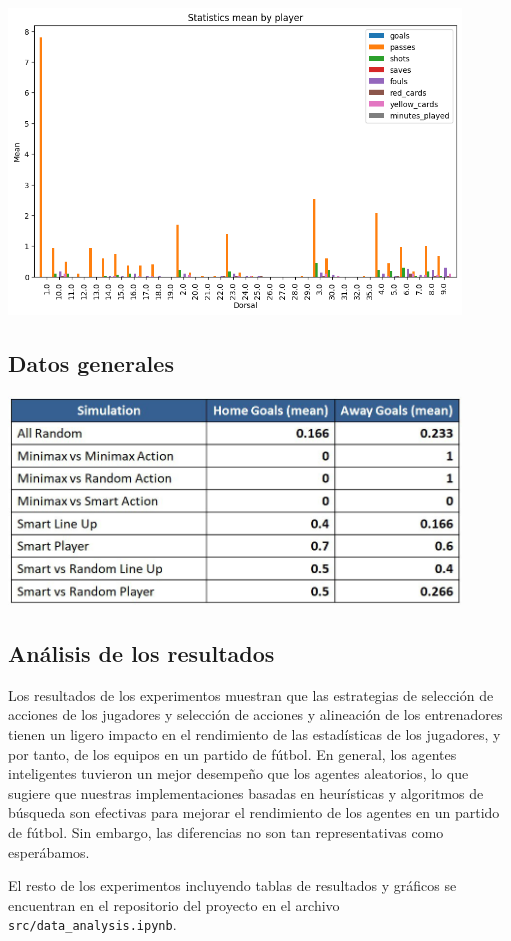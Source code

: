 \documentclass{article}
\begin{document}
\includegraphics[width=0.9\textwidth,height=0.5\textwidth]{smart_vs_random_line_up_away.png}

\subsection{Datos generales}

\includegraphics[width=0.9\textwidth]{general_data.jpg}

\subsection{Análisis de los resultados}
Los resultados de los experimentos muestran que las estrategias de selección de acciones de los jugadores y selección de acciones y alineación de los entrenadores
tienen un ligero impacto en el rendimiento de las estadísticas de los jugadores, y por tanto, de los equipos en un partido de fútbol. En general, los agentes inteligentes
tuvieron un mejor desempeño que los agentes aleatorios, lo que sugiere que nuestras implementaciones basadas en heurísticas y algoritmos de búsqueda son efectivas para
mejorar el rendimiento de los agentes en un partido de fútbol. Sin embargo, las diferencias no son tan representativas como esperábamos.

El resto de los experimentos incluyendo tablas de resultados y gráficos se encuentran en el repositorio del proyecto en el archivo \texttt{src/data\_analysis.ipynb}.
\end{document}
